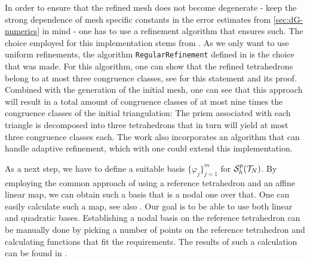 \documentclass[../thesis.tex]{subfiles}
\begin{document}
In order to ensure that the refined mesh does not become degenerate - keep the strong dependence of mesh specific constants in the error estimates from \cref{sec:dG-numerics} in mind - one has to use a refinement algorithm that ensures such.
The choice employed for this implementation stems from \cite{Bey}. As we only want to use uniform refinements, the algorithm \verb+RegularRefinement+ defined in \cite[p.\ 361]{Bey} is the choice that was made.
For this algorithm, one can show that the refined tetrahedrons belong to at most three congruence classes, see \cite[Theorem  1, p.\ 361]{Bey} for this statement and its proof.
Combined with the generation of the initial mesh, one can see that this approach will result in a total amount of congruence classes of at most nine times the congruence classes of the initial triangulation:
The prism associated with each triangle is decomposed into three tetrahedrons that in turn will yield at most three congruence classes each.
The work \cite{Bey} also incorporates an algorithm that can handle adaptive refinement, which with one could extend this implementation.

As a next step, we have to define a suitable basis $\{ \varphi_j \}_{j=1}^m$ for $\mathcal{S}_h^p(\mathcal{T}_N)$. By employing the common approach of using a reference tetrahedron and an affine linear map, we can obtain such a basis that is a nodal one over that.
One can easily calculate such a map, see also \cite[p.\ 254]{JungLanger}.
Our goal is to be able to use both linear and quadratic bases.
Establishing a nodal basis on the reference tetrahedron can be manually done by picking a number of points on the reference tetrahedron and calculating functions that fit the requirements. The results of such a calculation can be found in \cite[Tabelle 4.4, p.\ 257]{JungLanger}.
\end{document}
